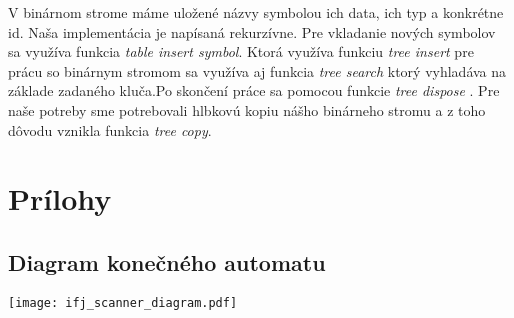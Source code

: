 \documentclass[12pt, a4paper]{article}
\begin{document}
				V binárnom strome máme uložené názvy symbolou ich data, ich typ a konkrétne id. Naša implementácia je napísaná rekurzívne. Pre vkladanie nových symbolov sa využíva funkcia \textit{table insert symbol}. Ktorá využíva funkciu \textit{tree insert} pre prácu so binárnym stromom sa využíva aj funkcia \textit{tree search} ktorý vyhladáva na základe zadaného kluča.Po skončení práce sa pomocou funkcie \textit{tree dispose} . Pre naše potreby sme potrebovali hlbkovú kopiu nášho binárneho stromu a z toho dôvodu vznikla funkcia \textit{tree copy}.
	\section{Prílohy}
        \subsection{Diagram konečného automatu} \label{sec:KA}
	    \begin{center}
	    	\texttt{[image: ifj\_scanner\_diagram.pdf]}
	    \end{center}
\end{document}
